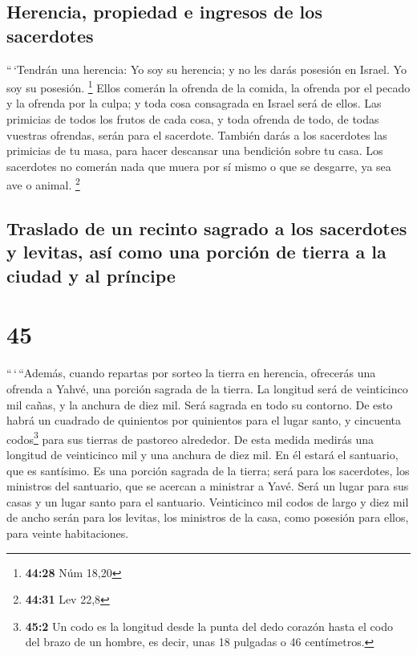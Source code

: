 \hypertarget{herencia-propiedad-e-ingresos-de-los-sacerdotes}{%
\subsection{Herencia, propiedad e ingresos de los
sacerdotes}\label{herencia-propiedad-e-ingresos-de-los-sacerdotes}}

 ``\,`Tendrán una herencia: Yo soy su herencia; y no les
darás posesión en Israel. Yo soy su posesión. \footnote{\textbf{44:28}
  Núm 18,20}  Ellos comerán la ofrenda de la comida, la
ofrenda por el pecado y la ofrenda por la culpa; y toda cosa consagrada
en Israel será de ellos.  Las primicias de todos los
frutos de cada cosa, y toda ofrenda de todo, de todas vuestras ofrendas,
serán para el sacerdote. También darás a los sacerdotes las primicias de
tu masa, para hacer descansar una bendición sobre tu casa.
 Los sacerdotes no comerán nada que muera por sí mismo o
que se desgarre, ya sea ave o animal. \footnote{\textbf{44:31} Lev 22,8}

\hypertarget{traslado-de-un-recinto-sagrado-a-los-sacerdotes-y-levitas-asuxed-como-una-porciuxf3n-de-tierra-a-la-ciudad-y-al-pruxedncipe}{%
\subsection{Traslado de un recinto sagrado a los sacerdotes y levitas,
así como una porción de tierra a la ciudad y al
príncipe}\label{traslado-de-un-recinto-sagrado-a-los-sacerdotes-y-levitas-asuxed-como-una-porciuxf3n-de-tierra-a-la-ciudad-y-al-pruxedncipe}}

\hypertarget{section-44}{%
\section{45}\label{section-44}}

 ``\,`\,``Además, cuando repartas por sorteo la tierra en
herencia, ofrecerás una ofrenda a Yahvé, una porción sagrada de la
tierra. La longitud será de veinticinco mil cañas, y la anchura de diez
mil. Será sagrada en todo su contorno.  De esto habrá un
cuadrado de quinientos por quinientos para el lugar santo, y cincuenta
codos\footnote{\textbf{45:2} Un codo es la longitud desde la punta del
  dedo corazón hasta el codo del brazo de un hombre, es decir, unas 18
  pulgadas o 46 centímetros.} para sus tierras de pastoreo alrededor.
 De esta medida medirás una longitud de veinticinco mil y
una anchura de diez mil. En él estará el santuario, que es santísimo.
 Es una porción sagrada de la tierra; será para los
sacerdotes, los ministros del santuario, que se acercan a ministrar a
Yavé. Será un lugar para sus casas y un lugar santo para el santuario.
 Veinticinco mil codos de largo y diez mil de ancho serán
para los levitas, los ministros de la casa, como posesión para ellos,
para veinte habitaciones.

